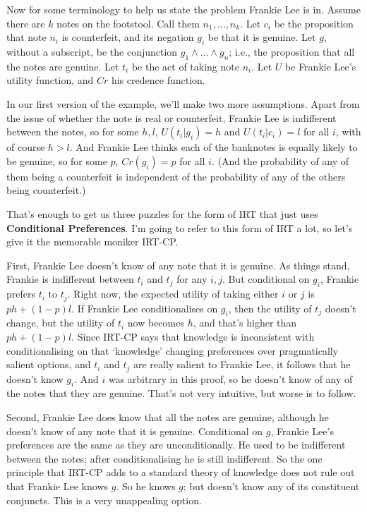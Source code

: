 \documentclass[11pt,]{book}
\begin{document}
Now for some terminology to help us state the problem Frankie Lee is in. Assume there are \(k\) notes on the footstool. Call them \(n_1, \dots, n_k\). Let \(c_i\) be the proposition that note \(n_i\) is counterfeit, and its negation \(g_i\) be that it is genuine. Let \(g\), without a subscript, be the conjunction \(g_1 \wedge \dots \wedge g_n\); i.e., the proposition that all the notes are genuine. Let \(t_i\) be the act of taking note \(n_i\). Let \(U\) be Frankie Lee's utility function, and \(Cr\) his credence function.

In our first version of the example, we'll make two more assumptions. Apart from the issue of whether the note is real or counterfeit, Frankie Lee is indifferent between the notes, so for some \(h, l\), \(U(t_i | g_i) = h\) and \(U(t_i | c_i) = l\) for all \(i\), with of course \(h > l\). And Frankie Lee thinks each of the banknotes is equally likely to be genuine, so for some \(p\), \(Cr(g_i) = p\) for all \(i\). (And the probability of any of them being a counterfeit is independent of the probability of any of the others being counterfeit.)

That's enough to get us three puzzles for the form of IRT that just uses \textbf{Conditional Preferences}. I'm going to refer to this form of IRT a lot, so let's give it the memorable moniker IRT-CP.

First, Frankie Lee doesn't know of any note that it is genuine. As things stand, Frankie is indifferent between \(t_i\) and \(t_j\) for any \(i, j\). But conditional on \(g_i\), Frankie prefers \(t_i\) to \(t_j\). Right now, the expected utility of taking either \(i\) or \(j\) is \(ph + (1-p)l\). If Frankie Lee conditionalises on \(g_i\), then the utility of \(t_j\) doesn't change, but the utility of \(t_i\) now becomes \(h\), and that's higher than \(ph + (1-p)l\). Since IRT-CP says that knowledge is inconsistent with conditionalising on that `knowledge' changing preferences over pragmatically salient options, and \(t_i\) and \(t_j\) are really salient to Frankie Lee, it follows that he doesn't know \(g_i\). And \(i\) was arbitrary in this proof, so he doesn't know of any of the notes that they are genuine. That's not very intuitive, but worse is to follow.

Second, Frankie Lee does know that all the notes are genuine, although he doesn't know of any note that it is genuine. Conditional on \(g\), Frankie Lee's preferences are the same as they are unconditionally. He used to be indifferent between the notes; after conditionalising he is still indifferent. So the one principle that IRT-CP adds to a standard theory of knowledge does not rule out that Frankie Lee knows \(g\). So he knows \(g\); but doesn't know any of its constituent conjuncts. This is a very unappealing option.
\end{document}
